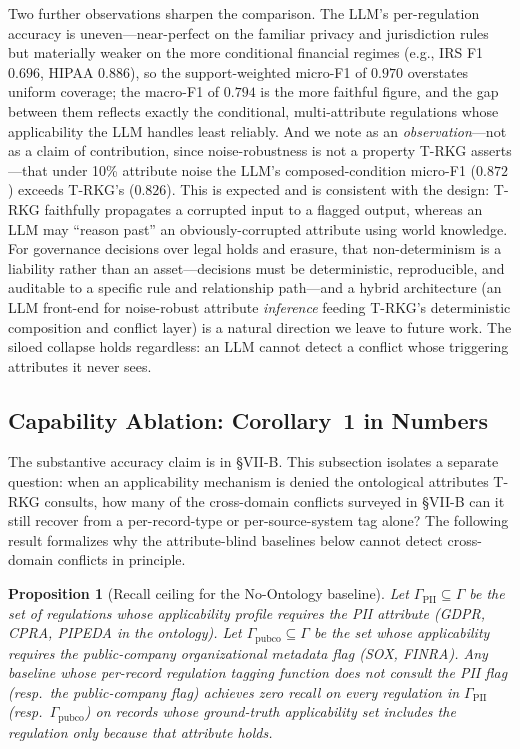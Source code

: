 \documentclass{ieeeaccess}
\newtheorem{proposition}{Proposition}
\begin{document}
Two further observations sharpen the comparison. The LLM's per-regulation accuracy is uneven---near-perfect on the familiar privacy and jurisdiction rules but materially weaker on the more conditional financial regimes (e.g., IRS F1 $0.696$, HIPAA $0.886$), so the support-weighted micro-F1 of $0.970$ overstates uniform coverage; the macro-F1 of $0.794$ is the more faithful figure, and the gap between them reflects exactly the conditional, multi-attribute regulations whose applicability the LLM handles least reliably. And we note as an \emph{observation}---not as a claim of contribution, since noise-robustness is not a property T-RKG asserts---that under 10\% attribute noise the LLM's composed-condition micro-F1 ($0.872$) exceeds T-RKG's ($0.826$). This is expected and is consistent with the design: T-RKG faithfully propagates a corrupted input to a flagged output, whereas an LLM may ``reason past'' an obviously-corrupted attribute using world knowledge. For governance decisions over legal holds and erasure, that non-determinism is a liability rather than an asset---decisions must be deterministic, reproducible, and auditable to a specific rule and relationship path---and a hybrid architecture (an LLM front-end for noise-robust attribute \emph{inference} feeding T-RKG's deterministic composition and conflict layer) is a natural direction we leave to future work. The siloed collapse holds regardless: an LLM cannot detect a conflict whose triggering attributes it never sees.

\subsection{Capability Ablation: Corollary~1 in Numbers}
\label{sec:rq1}

The substantive accuracy claim is in §VII-B. This subsection isolates a separate question: when an applicability mechanism is denied the ontological attributes T-RKG consults, how many of the cross-domain conflicts surveyed in §VII-B can it still recover from a per-record-type or per-source-system tag alone? The following result formalizes why the attribute-blind baselines below cannot detect cross-domain conflicts in principle.

\begin{proposition}[Recall ceiling for the No-Ontology baseline]
Let $\Gamma_{\mathrm{PII}} \subseteq \Gamma$ be the set of regulations whose applicability profile requires the PII attribute (GDPR, CPRA, PIPEDA in the ontology). Let $\Gamma_{\mathrm{pubco}} \subseteq \Gamma$ be the set whose applicability requires the public-company organizational metadata flag (SOX, FINRA). Any baseline whose per-record regulation tagging function does not consult the PII flag (resp.\ the public-company flag) achieves zero recall on every regulation in $\Gamma_{\mathrm{PII}}$ (resp.\ $\Gamma_{\mathrm{pubco}}$) on records whose ground-truth applicability set includes the regulation only because that attribute holds.
\end{proposition}
\end{document}

